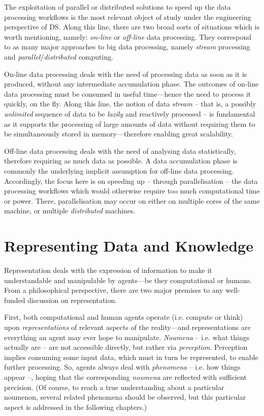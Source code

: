 \documentclass[12pt,a4paper,openright,twoside]{book}
\begin{document}
The exploitation of parallel or distributed solutions to speed up the data processing workflows is the most relevant object of study under the engineering perspective of DS.
%
Along this line, there are two broad sorts of situations which is worth mentioning, namely: \emph{on-line} or \emph{off-line} data processing.
%
They correspond to as many major approaches to big data processing, namely \emph{stream} processing and \emph{parallel}/\emph{distributed} computing.

On-line data processing deals with the need of processing data as soon as it is produced, without any intermediate accumulation phase.
%
The outcomes of on-line data processing must be consumed in useful time---hence the need to process it quickly, on the fly.
%
Along this line, the notion of data \emph{stream} -- that is, a possibly \emph{unlimited} sequence of data to be \emph{lazily} and reactively processed -- is fundamental as it supports the processing of large amounts of data without requiring them to be simultaneously stored in memory---therefore enabling great scalability.

Off-line data processing deals with the need of analysing data statistically, therefore requiring as much data as possible.
%
A data accumulation phase is commonly the underlying implicit assumption for off-line data processing.
%
Accordingly, the focus here is on speeding up -- through parallelisation -- the data processing workflows which would otherwise require too much computational time or power.
%
There, parallelisation may occur on either on multiple cores of the same machine, or multiple \emph{distributed} machines.

\chapter{Representing Data and Knowledge}
\label{chap:kr}

Representation deals with the expression of information to make it understandable and manipulable by agents---be they computational or humans.
%
From a philosophical perspective, there are two major premises to any well-funded discussion on representation.

First, both computational and human agents operate (i.e. compute or think) upon \emph{representations} of relevant aspects of the reality---and representations are everything an agent may ever hope to manipulate.
%
\emph{Noumena} -- i.e. what things actually are -- are not accessible directly, but rather via \emph{perception}.
%
Perception implies consuming some input data, which must in turn be represented, to enable further processing.
%
So, agents always deal with \emph{phenomena} -- i.e. how things appear --, hoping that the corresponding \emph{noumena} are reflected with sufficient precision.
%
(Of course, to reach a true understanding about a particular noumenon, several related phenomena should be observed, but this particular aspect is addressed in the following chapters.)
%
\end{document}
